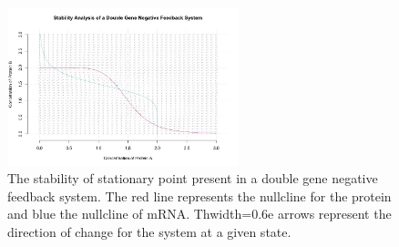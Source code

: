 \documentclass[]{article}
\begin{document}
            \begin{figure}[h!]
            \centering
            \includegraphics[width=0.6\textwidth]{./figures/stabilityDoubleNegative.jpeg}
            \caption{The stability of stationary point present in a double gene negative feedback system. The red line represents the nullcline for the protein and blue the nullcline of mRNA. Thwidth=0.6e arrows represent the direction of change for the system at a given state.}
            \label{stabilityDoubleNegative}
            \end{figure}
            
\end{document}
